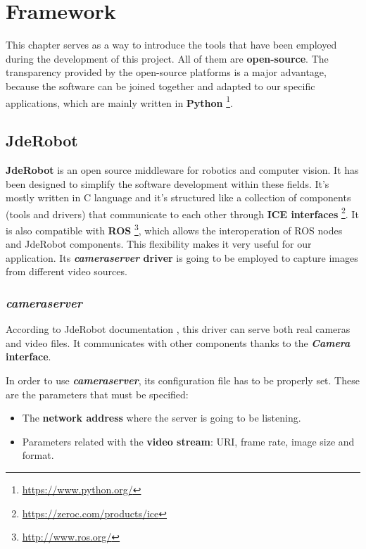 \chapter{Framework}\label{ch:framework}
This chapter serves as a way to introduce the tools that have been employed during the development of this project. All of them are \textbf{open-source}. The transparency provided by the open-source platforms is a major advantage, because the software can be joined together and adapted to our specific applications, which are mainly written in \textbf{Python} \footnote{\url{https://www.python.org/}}.

\section{JdeRobot}\label{sec:jderobot}
\textbf{JdeRobot} \cite{jderobot} is an open source middleware for robotics and computer vision. It has been designed to simplify the software development within these fields. It's mostly written in C\nolinebreak[4]\hspace{-.05em}\raisebox{.4ex}{\tiny\bf ++} language and it's structured like a collection of components (tools and drivers) that communicate to each other through \textbf{ICE interfaces} \footnote{\url{https://zeroc.com/products/ice}}. It is also compatible with \textbf{ROS} \footnote{\url{http://www.ros.org/}}, which allows the interoperation of ROS nodes and JdeRobot components. This flexibility makes it very useful for our application.
Its \textbf{\textit{cameraserver} driver} is going to be employed to capture images from different video sources.

\subsection{\textit{cameraserver}}\label{subsec:cameraserver}
According to JdeRobot documentation \cite{jderobot}, this driver can serve both real cameras and video files. It communicates with other components thanks to the \textbf{\textit{Camera} interface}.

In order to use \textbf{\textit{cameraserver}}, its configuration file has to be properly set. These are the parameters that must be specified:
\begin{itemize}
    \item The \textbf{network address} where the server is going to be listening.
    
    \item Parameters related with the \textbf{video stream}: URI, frame rate, image size and format.
\end{itemize}

